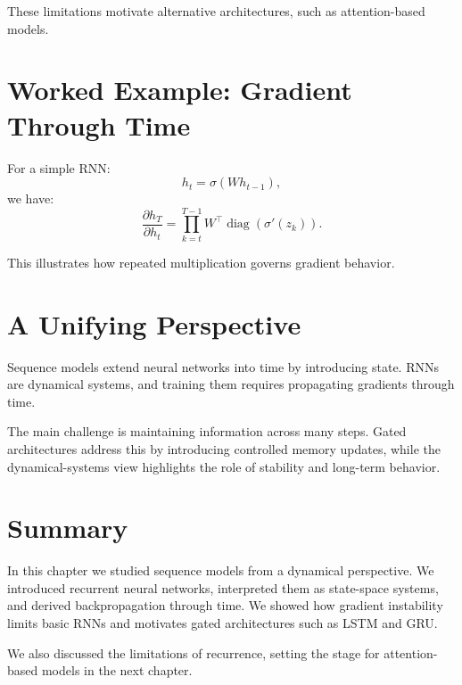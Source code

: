 These limitations motivate alternative architectures, such as attention-based models.

\section{Worked Example: Gradient Through Time}

For a simple RNN:
\[
h_t = \sigma(W h_{t-1}),
\]
we have:
\[
\frac{\partial h_T}{\partial h_t}
=
\prod_{k=t}^{T-1} W^\top \operatorname{diag}(\sigma'(z_k)).
\]

This illustrates how repeated multiplication governs gradient behavior.

\section{A Unifying Perspective}

Sequence models extend neural networks into time by introducing state. RNNs are dynamical systems, and training them requires propagating gradients through time.

The main challenge is maintaining information across many steps. Gated architectures address this by introducing controlled memory updates, while the dynamical-systems view highlights the role of stability and long-term behavior.

\section{Summary}

In this chapter we studied sequence models from a dynamical perspective. We introduced recurrent neural networks, interpreted them as state-space systems, and derived backpropagation through time. We showed how gradient instability limits basic RNNs and motivates gated architectures such as LSTM and GRU.

We also discussed the limitations of recurrence, setting the stage for attention-based models in the next chapter.